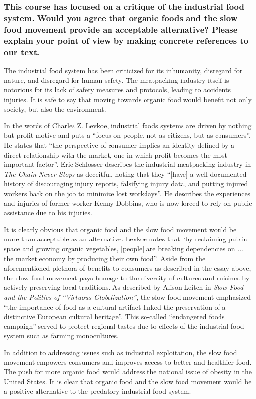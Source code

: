 \documentclass[letterpaper, 12pt]{article}
\begin{document}
\subsubsection*{This course has focused on a critique of the industrial food
system. Would you agree that organic foods and the slow food movement provide
an acceptable alternative? Please explain your point of view by making concrete
references to our text.}
The industrial food system has been criticized for its inhumanity, disregard
for nature, and disregard for human safety. The meatpacking industry itself is
notorious for its lack of safety measures and protocols, leading to accidents
injuries. It is safe to say that moving towards organic food would benefit not
only society, but also the environment. \par
In the words of Charles Z. Levkoe, industrial foods systems are driven by
nothing but profit motive and puts a ``focus on people, not as citizens, but as
consumers''. He states that ``the perspective of consumer implies an identity
defined by a direct relationship with the market, one in which profit becomes
the most important factor''. Eric Schlosser describes the industrial
meatpacking industry in \textit{The Chain Never Stops} as deceitful, noting
that they ``[have] a well-documented history of discouraging injury reports,
falsifying injury data, and putting injured workers back on the job to minimize
lost workdays''. He describes the experiences and injuries of former worker
Kenny Dobbins, who is now forced to rely on public assistance due to his
injuries. \par
It is clearly obvious that organic food and the slow food movement would be
more than acceptable as an alternative. Levkoe notes that ``by reclaiming
public space and growing organic vegetables, [people] are breaking dependencies
on ... the market economy by producing their own food''. Aside from the
aforementioned plethora of benefits to consumers as described in the essay
above, the slow food movement pays homage to the diversity of cultures
and cuisines by actively preserving local traditions. As described by Alison
Leitch in \textit{Slow Food and the Politics of ``Virtuous Globalization''},
the slow food movement emphasized ``the importance of food as a cultural
artifact linked the preservation of a distinctive European cultural heritage''.
This so-called ``endangered foods campaign'' served to protect regional tastes
due to effects of the industrial food system such as farming monocultures. \par
In addition to addressing issues such as industrial exploitation, the slow food
movement empowers consumers and improves access to better and healthier food.
The push for more organic food would address the national issue of obesity in
the United States. It is clear that organic food and the slow food movement
would be a positive alternative to the predatory industrial food system.
\end{document}
